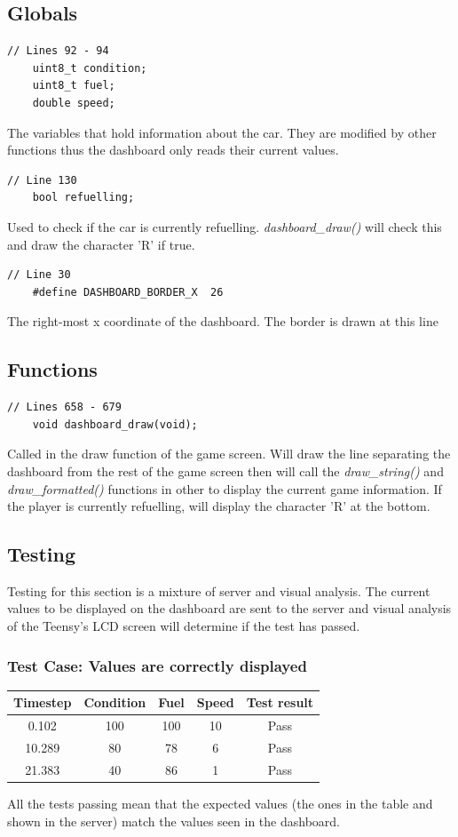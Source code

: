 \documentclass{article}
\begin{document}
\subsection*{Globals}
\begin{lstlisting}[style=CStyle]
	// Lines 92 - 94
	uint8_t condition;
	uint8_t fuel;
	double speed;
\end{lstlisting}
The variables that hold information about the car. They are modified by other functions thus the dashboard only reads their current values.
\begin{lstlisting}[style=CStyle]
	// Line 130
	bool refuelling;
\end{lstlisting}
Used to check if the car is currently refuelling. \emph{dashboard\_draw()} will check this and draw the character 'R' if true.
\begin{lstlisting}[style=CStyle]
	// Line 30
	#define DASHBOARD_BORDER_X  26
\end{lstlisting}
The right-most x coordinate of the dashboard. The border is drawn at this line
\newline

\subsection*{Functions}
\begin{lstlisting}[style=CStyle]
	// Lines 658 - 679
	void dashboard_draw(void);
\end{lstlisting}
Called in the draw function of the game screen. Will draw the line separating the dashboard from the rest of the game screen then will call the \emph{draw\_string()} and \emph{draw\_formatted()} functions in other to display the current game information. If the player is currently refuelling, will display the character 'R' at the bottom. 
\newline

\subsection*{Testing}
Testing for this section is a mixture of server and visual analysis. The current values to be displayed on the dashboard are sent to the server and visual analysis of the Teensy's LCD screen will determine if the test has passed.
\subsubsection*{Test Case: Values are correctly displayed}
\begin{center}
\begin{tabular}{ c c c c c }
Timestep	& Condition	& Fuel		& Speed	& Test result	\\ \hline
0.102		& 100		& 100		& 10		& Pass	\\
10.289	& 80		& 78		& 6		& Pass	\\ 
21.383	& 40		& 86		& 1		& Pass	\\ \hline
\end{tabular}
\end{center}
All the tests passing mean that the expected values (the ones in the table and shown in the server) match the values seen in the dashboard.
\end{document}
